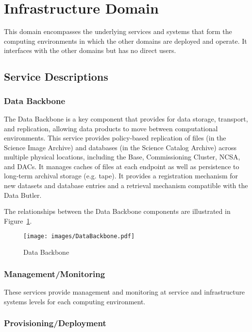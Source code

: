 \documentclass[DM,toc]{lsstdoc}
\begin{document}
\section{Infrastructure Domain}\label{infrastructure-domain}

This domain encompasses the underlying services and systems that form
the computing environments in which the other domains are deployed and
operate. It interfaces with the other domains but has no direct users.

\subsection{Service Descriptions}\label{infrastructure-service-descriptions}

\subsubsection{Data Backbone}\label{data-backbone}

The Data Backbone is a key component that provides for data storage,
transport, and replication, allowing data products to move between
computational environments. This service provides policy-based
replication of files (in the Science Image Archive) and databases (in
the Science Catalog Archive) across multiple physical locations,
including the Base, Commissioning Cluster, NCSA, and DACs. It manages
caches of files at each endpoint as well as persistence to long-term
archival storage (e.g. tape). It provides a registration mechanism for
new datasets and database entries and a retrieval mechanism compatible
with the Data Butler.

The relationships between the Data Backbone components are illustrated
in Figure~\ref{fig:dbb}.

\begin{figure}
\centering
\texttt{[image: images/DataBackbone.pdf]}
\caption{Data Backbone}
\label{fig:dbb}
\end{figure}

\subsubsection{Management/Monitoring}\label{managementmonitoring}

These services provide management and monitoring at service and
infrastructure systems levels for each computing environment.

\subsubsection{Provisioning/Deployment}\label{provisioningdeployment}
\end{document}

